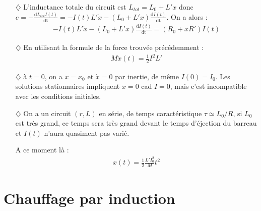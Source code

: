 \documentclass{report}
\begin{document}
\begin{itemize}

	\item[$\diamondsuit$] L'inductance totale du circuit est $L_{tot}=L_0+L'x$ donc $e=-\frac{\mathrm{d}L_{tot}I(t)}{\mathrm{dt}}=-I(t)L'\dot{x}-(L_0+L'x)\frac{\mathrm{d}I(t)}{\mathrm{dt}}$. On a alors :
	\begin{align*}
		-I(t)L'\dot{x}-(L_0+L'x)\frac{\mathrm{d}I(t)}{\mathrm{dt}} = (R_0+xR')I(t)
	\end{align*}
	
	\item[$\diamondsuit$] En utilisant la formule de la force trouvée précédemment :
	\begin{align*}
		M\ddot{x}(t)=\frac{1}{2}I^2L'
	\end{align*}
	
	\item[$\diamondsuit$] à $t=0$, on a $x=x_0$ et $\dot{x}=0$ par inertie, de même $I(0)=I_0$. Les solutions stationnaires impliquent $\ddot{x}=0$ cad $I=0$, mais c'est incompatible avec les conditions initiales. 
	
	\item[$\diamondsuit$] On a un circuit $(r,L)$ en série, de temps caractéristique $\tau\simeq L_0/R$, si $L_0$ est très grand, ce temps sera très grand devant le temps d'éjection du barreau et $I(t)$ n'aura quasiment pas varié. 
	
	A ce moment là :
	\begin{align*}		
		x(t)=\frac{1}{2}\frac{L'I_0^2}{M} t^2	
	\end{align*}

\end{itemize}

\section*{Chauffage par induction}
\end{document}
